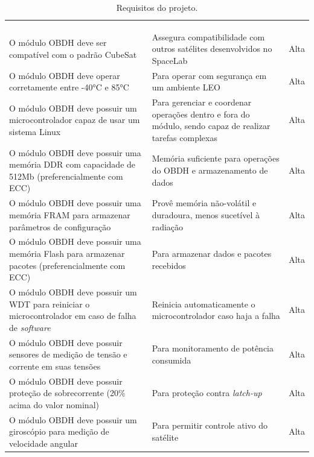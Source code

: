 \begin{longtable}{@{}p{5cm}p{5cm}p{3.5cm}@{}}
    \centering
	\ABNTEXfontereduzida
	\label{tab:Tab_Req}\tabularnewline
	\caption{Requisitos do projeto.}\tabularnewline
	\hline
	\textbf{\centering{Descrição}} & \textbf{\centering{Pretexto}} & \textbf{\centering{Prioridade}} \tabularnewline
        \hline
        O módulo OBDH deve ser compatível com o padrão CubeSat & Assegura compatibilidade com outros satélites desenvolvidos no SpaceLab & Alta \tabularnewline
        
       \hline
        O módulo OBDH deve operar corretamente entre -40°C e 85°C & Para operar com segurança em um ambiente LEO & Alta \tabularnewline

       \hline
        O módulo OBDH deve possuir um microcontrolador capaz de usar um sistema Linux & Para gerenciar e coordenar operações dentro e fora do módulo, sendo capaz de realizar tarefas complexas  & Alta \tabularnewline

       \hline
        O módulo OBDH deve possuir uma memória DDR com capacidade de 512Mb (preferencialmente com ECC)  & Memória suficiente para operações do OBDH e armazenamento de dados  & Alta\tabularnewline

        \hline
        O módulo OBDH deve possuir uma memória FRAM para armazenar parâmetros de configuração & Provê memória não-volátil e duradoura, menos sucetível à radiação & Alta \tabularnewline 

        \hline
        O módulo OBDH deve possuir uma memória Flash para armazenar pacotes (preferencialmente com ECC) & Para armazenar dados e pacotes recebidos & Alta\tabularnewline 

        \hline
        O módulo OBDH deve possuir um WDT para reiniciar o microcontrolador em caso de falha de \textit{software} & Reinicia automaticamente o microcontrolador caso haja a falha  & Alta \tabularnewline

        \hline
        O módulo OBDH deve possuir sensores de medição de tensão e corrente em suas tensões & Para monitoramento de potência consumida & Alta\tabularnewline

        \hline
        O módulo OBDH deve possuir proteção de sobrecorrente (20\% acima do valor nominal) & Para proteção contra \textit{latch-up}  & Alta \tabularnewline

        \hline
        O módulo OBDH deve possuir um giroscópio para medição de velocidade angular & Para permitir controle ativo do satélite  & Alta \tabularnewline 


\end{longtable}
